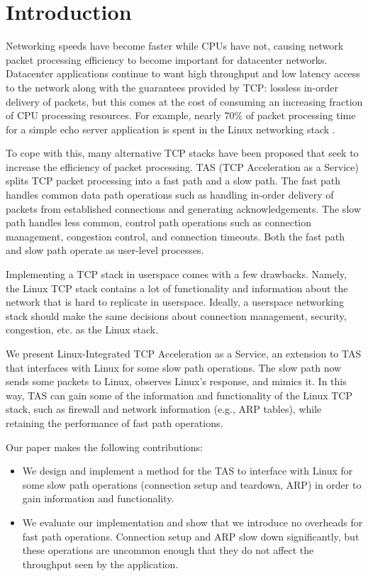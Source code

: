 \section{Introduction}\label{Introduction}

Networking speeds have become faster while CPUs have not, causing network packet
processing efficiency to become important for datacenter networks. Datacenter
applications continue to want high throughput and low latency access to the
network along with the guarantees provided by TCP: lossless in-order delivery of
packets, but this comes at the cost of consuming an increasing fraction of CPU
processing resources. For example, nearly 70\% of packet processing time for a
simple echo server application is spent in the Linux networking stack 
\cite{peter:arrakis}.

To cope with this, many alternative TCP stacks have been proposed that seek to
increase the efficiency of packet processing. TAS (TCP Acceleration as a
Service) splits TCP packet processing into a fast path and a slow path. The fast
path handles common data path operations such as handling in-order delivery of
packets from established connections and generating acknowledgements. The slow
path handles less common, control path operations such as connection management,
congestion control, and connection timeouts. Both the fast path and slow path
operate as user-level processes.

Implementing a TCP stack in userspace comes with a few drawbacks. Namely, the
Linux TCP stack contains a lot of functionality and information about the
network that is hard to replicate in userspace. Ideally, a userspace networking 
stack should make the same decisions about connection management, security,
congestion, etc. as the Linux stack.

We present Linux-Integrated TCP Acceleration as a Service, an extension to TAS
that interfaces with Linux for some slow path operations. The slow path now
sends some packets to Linux, observes Linux's response, and mimics it. In this
way, TAS can gain some of the information and functionality of the Linux TCP
stack, such as firewall and network information (e.g., ARP tables), while
retaining the performance of fast path operations.

Our paper makes the following contributions:

\begin{itemize}
\item We design and implement a method for the TAS to interface with Linux for
  some slow path operations (connection setup and teardown, ARP) in order to
  gain information and functionality.

\item We evaluate our implementation and show that we introduce no overheads
  for fast path operations. Connection setup and ARP slow down significantly,
  but these operations are uncommon enough that they do not affect the
  throughput seen by the application.
\end{itemize}

